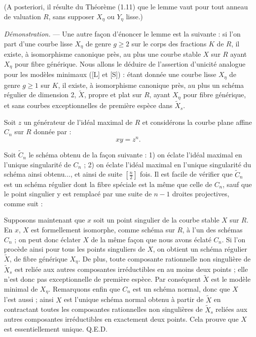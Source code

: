 \documentclass[10pt]{article}
\newcommand{\QED}{\hfill Q.E.D.}
\begin{document}
(A posteriori, il résulte du Théorème (1.11) que le lemme vaut pour tout anneau de valuation $R$, sans supposer $X_\eta$ ou $Y_\eta$ lisse.)

\noindent\emph{Démonstration.} --- Une autre façon d'énoncer le lemme est la suivante : si l'on part d'une courbe lisse $X_\eta$ de genre $g\geq2$ sur le corps des fractions $K$ de $R$, il existe, à isomorphisme canonique près, au plus une courbe stable $X$ sur $R$ ayant $X_\eta$ pour fibre générique. Nous allons le déduire de l'assertion d'unicité analogue pour les modèles minimaux ([L] et [S]) : étant donnée une courbe lisse $X_\eta$ de genre $g\geq1$ sur $K$, il existe, à isomorphisme canonique près, au plus un schéma régulier de dimension 2, $\widetilde X$, propre et plat sur $R$, ayant $X_\eta$ pour fibre générique, et sans courbes exceptionnelles de première espèce dans $\widetilde X_s$.

Soit $z$ un générateur de l'idéal maximal de $R$ et considérons la courbe plane affine $C_n$ sur $R$ donnée par :
\[
xy=z^n.
\]


Soit $\widetilde C_n$ le schéma obtenu de la façon suivante : 1) on éclate l'idéal maximal en l'unique singularité de $C_n$ ; 2) on éclate l'idéal maximal en l'unique singularité du schéma ainsi obtenu..., et ainsi de suite $\left[\frac n2\right]$ fois. Il est facile de vérifier que $\widetilde C_n$ est un schéma régulier dont la fibre spéciale est la même que celle de $C_n$, sauf que le point singulier y est remplacé par une suite de $n-1$ droites projectives, comme suit :

\begin{center}
\end{center}

Supposons maintenant que $x$ soit un point singulier de la courbe stable $X$ sur $R$. En $x$, $X$ est formellement isomorphe, comme schéma sur $R$, à l'un des schémas $C_n$ ; on peut donc éclater $X$ de la même façon que nous avons éclaté $C_n$. Si l'on procède ainsi pour tous les points singuliers de $X$, on obtient un schéma régulier $\widetilde X$, de fibre générique $X_\eta$. De plus, toute composante rationnelle non singulière de $\widetilde X_s$ est reliée aux autres composantes irréductibles en au moins deux points ; elle n'est donc pas exceptionnelle de première espèce. Par conséquent $\widetilde X$ est le modèle minimal de $X_\eta$. Remarquons enfin que $C_n$ est un schéma normal, donc que $X$ l'est aussi ; ainsi $X$ est l'unique schéma normal obtenu à partir de $\widetilde X$ en contractant toutes les composantes rationnelles non singulières de $\widetilde X_s$ reliées aux autres composantes irréductibles en exactement deux points. Cela prouve que $X$ est essentiellement unique. \QED
\end{document}
